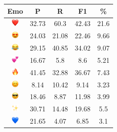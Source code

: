 \documentclass{article}
\begin{document}
\begin{table}
\centering
\begin{tabular}{|c|ccc|c|} \hline
\textbf{Emo} & \textbf{P} & \textbf{R} & \textbf{F1} & \textbf{\%} \\ \hline
\includegraphics[height=0.37cm,width=0.37cm]{img/red_heart.png} & 32.73 & 60.3 & 42.43 & 21.6\\ 
\includegraphics[height=0.37cm,width=0.37cm]{img/smiling_face_with_hearteyes.png} & 24.03 & 21.08 & 22.46 & 9.66\\ 
\includegraphics[height=0.37cm,width=0.37cm]{img/face_with_tears_of_joy.png} & 29.15 & 40.85 & 34.02 & 9.07\\ 
\includegraphics[height=0.37cm,width=0.37cm]{img/two_hearts.png} & 16.67 & 5.8 & 8.6 & 5.21\\ 
\includegraphics[height=0.37cm,width=0.37cm]{img/fire.png} & 41.45 & 32.88 & 36.67 & 7.43\\ 
\includegraphics[height=0.37cm,width=0.37cm]{img/smiling_face_with_smiling_eyes.png} & 8.14 & 10.42 & 9.14 & 3.23\\ 
\includegraphics[height=0.37cm,width=0.37cm]{img/smiling_face_with_sunglasses.png} & 18.46 & 8.87 & 11.98 & 3.99\\ 
\includegraphics[height=0.37cm,width=0.37cm]{img/sparkles.png} & 30.71 & 14.48 & 19.68 & 5.5\\ 
\includegraphics[height=0.37cm,width=0.37cm]{img/blue_heart.png} & 21.65 & 4.07 & 6.85 & 3.1\\ 

\end{tabular}
\end{table}
\end{document}
